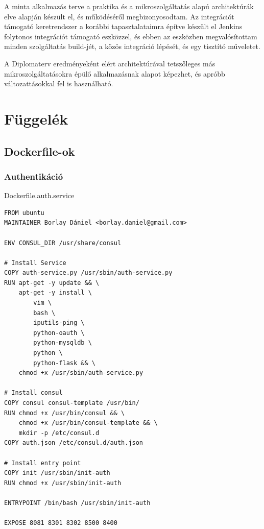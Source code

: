 \documentclass[11pt,magyar,a4paper,twoside,]{report}
\begin{document}
A minta alkalmazás terve a praktika és a mikroszolgáltatás alapú
architektúrák elve alapján készült el, és működéséről megbizonyosodtam.
Az integrációt támogató keretrendszer a korábbi tapasztalataimra építve
készült el Jenkins folytonos integrációt támogató eszközzel, és ebben az
eszközben megvalósítottam minden szolgáltatás build-jét, a közös
integráció lépését, és egy tisztító műveletet.

A Diplomaterv eredményeként elért architektúrával tetszőleges más
mikroszolgáltatásokra épülő alkalmazásnak alapot képezhet, és apróbb
változattásokkal fel is használható.

\listoftables
\listoffigures




\appendix

\chapter{Függelék}\label{fuxfcggeluxe9k}

\section{Dockerfile-ok}\label{dockerfile-ok}

\subsection{Authentikáció}\label{authentikuxe1ciuxf3}

Dockerfile.auth.service

\begin{verbatim}
FROM ubuntu
MAINTAINER Borlay Dániel <borlay.daniel@gmail.com>

ENV CONSUL_DIR /usr/share/consul

# Install Service
COPY auth-service.py /usr/sbin/auth-service.py
RUN apt-get -y update && \
    apt-get -y install \
        vim \
        bash \
        iputils-ping \
        python-oauth \
        python-mysqldb \
        python \
        python-flask && \
    chmod +x /usr/sbin/auth-service.py

# Install consul
COPY consul consul-template /usr/bin/
RUN chmod +x /usr/bin/consul && \
    chmod +x /usr/bin/consul-template && \
    mkdir -p /etc/consul.d
COPY auth.json /etc/consul.d/auth.json

# Install entry point
COPY init /usr/sbin/init-auth
RUN chmod +x /usr/sbin/init-auth

ENTRYPOINT /bin/bash /usr/sbin/init-auth

EXPOSE 8081 8301 8302 8500 8400
\end{verbatim}
\end{document}
